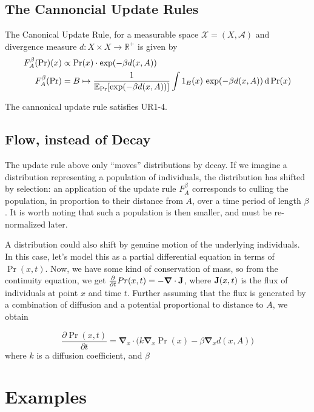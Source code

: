 \documentclass{article}
\begin{document}
\subsection{The Cannoncial Update Rules}
The Canonical Update Rule, for a measurable space $\mathcal X = (X, \mathcal A)$ and divergence measure $d: X \times X \to \mathbb R^+$ is given by
\begin{align*}
    F^\beta_A(\Pr)(x) &\propto \Pr(x) \cdot \exp(-\beta d(x, A)) \\
    F^\beta_A(\Pr) &= B \mapsto \frac{1}{\operatorname*{\mathbb{E}}_{\Pr}[\exp(-\beta d(x,A))]}\int
        1_B(x) \, \exp(-\beta d(x, A)) \,\mathrm d\Pr(x)
\end{align*}
\begin{prop}
    The cannonical update rule satisfies UR1-4.
\end{prop}

\subsection{Flow, instead of Decay}
\def\vgrad{\boldsymbol\nabla}
The update rule above only ``moves'' distributions by decay. If we imagine a distribution representing a population of individuals, the distribution has shifted by selection: an application of the update rule $F_A^\beta$ corresponds to culling the population, in proportion to their distance from $A$, over a time period of length $\beta$. 
It is worth noting that such a population is then smaller, and must be re-normalized later.

A distribution could also shift by genuine motion of the underlying individuals. 
In this case, let's model this as a partial differential equation in terms of $\Pr(x,t)$. 
Now, we have some kind of conservation of mass, so from the continuity equation, we get
$\frac{\partial }{\partial t}Pr(x,t) = - \vgrad \cdot \mat J$, 
where $\mathbf{J}(x,t)$ is the flux of individuals at point $x$ and time $t$.
Further assuming that the flux is generated by a combination of diffusion and a potential proportional to distance to $A$, we obtain

\[
    \frac{\partial \Pr(x, t)}{\partial t} = \vgrad_{\!x} \cdot \Big( k \vgrad_{\!x} \Pr (x) - \beta \vgrad_{\!x} d(x, A) \Big)
\]
where $k$ is a diffusion coefficient, and $\beta$





\section{Examples}
\end{document}
